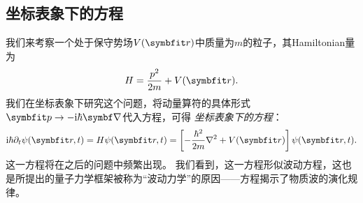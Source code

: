 \subsection{坐标表象下的\schrodinger 方程}
\label{subsec:cmr_schrodinger}

我们来考察一个处于保守势场$V(\rr)$中质量为$m$的粒子，其Hamiltonian量为
\begin{equation}
    H = \frac{p^2}{2m} + V(\rr).
\end{equation}
我们在坐标表象下研究这个问题，将动量算符的具体形式$\pp\rightarrow -\ii\hbar\del$代入\schrodinger 方程，可得
\emph{坐标表象下的\schrodinger 方程}：
\begin{equation}
    \ii\hbar\pd_t \psi(\rr,t) = H\psi(\rr,t) = \left[-\frac{\hbar^2}{2m}\nabla^2 + V(\rr)\right]\psi(\rr,t).
\end{equation}
这一方程将在之后的问题中频繁出现。
我们看到，这一方程形似波动方程，这也是\schrodinger 所提出的量子力学框架被称为“波动力学”的原因——\schrodinger 方程揭示了物质波的演化规律。
